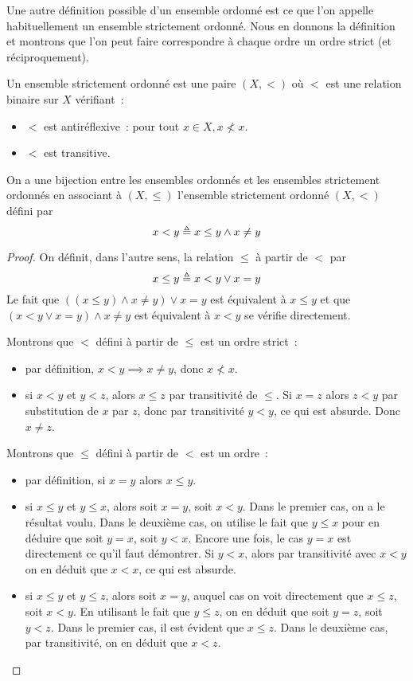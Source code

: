 Une autre définition possible d'un ensemble ordonné est ce que l'on appelle
habituellement un ensemble strictement ordonné. Nous en donnons la définition et
montrons que l'on peut faire correspondre à chaque ordre un ordre strict (et
réciproquement).

\begin{definition}
  Un ensemble strictement ordonné est une paire $(X,<)$ où $<$ est une relation
  binaire sur $X$ vérifiant~:
  \begin{itemize}
  \item $<$ est antiréflexive~: pour tout $x\in X, x\not< x$.
  \item $<$ est transitive.
  \end{itemize}
\end{definition}

\begin{proposition}
  On a une bijection entre les ensembles ordonnés et les ensembles strictement
  ordonnés en associant à $(X,\leq)$ l'ensemble strictement ordonné $(X,<)$
  défini par
  \[x < y \triangleq x \leq y \land x \neq y\]
\end{proposition}

\begin{proof}
  On définit, dans l'autre sens, la relation $\leq$ à partir de $<$ par
  \[x\leq y \triangleq x < y \lor x = y\]
  Le fait que $((x \leq y)\land x \neq y) \lor x = y$ est équivalent à $x\leq y$
  et que $(x < y\lor x = y) \land x \neq y$ est équivalent à $x < y$ se vérifie
  directement.

  Montrons que $<$ défini à partir de $\leq$ est un ordre strict~:
  \begin{itemize}
  \item par définition, $x < y\implies x \neq y$, donc $x\not< x$.
  \item si $x < y$ et $y < z$, alors $x \leq z$ par transitivité de $\leq$.
    Si $x = z$ alors $z < y$ par substitution de $x$ par $z$, donc par
    transitivité $y < y$, ce qui est absurde. Donc $x \neq z$.
  \end{itemize}

  Montrons que $\leq$ défini à partir de $<$ est un ordre~:
  \begin{itemize}
  \item par définition, si $x = y$ alors $x\leq y$.
  \item si $x\leq y$ et $y\leq x$, alors soit $x = y$, soit $x < y$. Dans le
    premier cas, on a le résultat voulu. Dans le deuxième cas, on utilise le
    fait que $y\leq x$ pour en déduire que soit $y = x$, soit $y < x$. Encore
    une fois, le cas $y = x$ est directement ce qu'il faut démontrer.
    Si $y < x$, alors par transitivité avec $x < y$ on en déduit que $x < x$,
    ce qui est absurde.
  \item si $x \leq y$ et $y \leq z$, alors soit $x = y$, auquel cas on voit
    directement que $x\leq z$, soit $x < y$. En utilisant le fait que
    $y \leq z$, on en déduit que soit $y = z$, soit $y < z$. Dans le premier
    cas, il est évident que $x \leq z$. Dans le deuxième cas, par transitivité,
    on en déduit que $x < z$.
  \end{itemize}
\end{proof}

